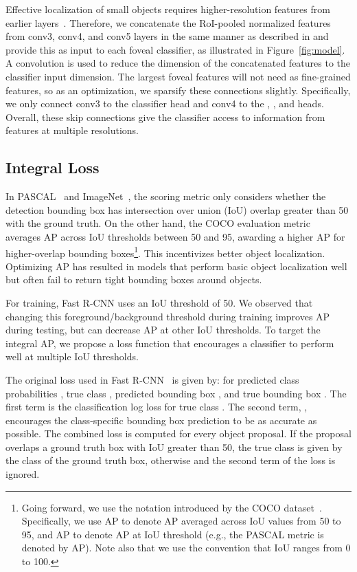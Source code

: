 \documentclass{bmvc2k}
\newcommand{\AP}[1]{AP\xspace}
\newcommand{\fig}[1]{Figure~\ref{fig:#1}}
\begin{document}
Effective localization of small objects requires higher-resolution features from earlier layers~\cite{sermanetCVPR2013, longCVPR15fcn, BharathCVPR2015, bell15ion, pinheiro2016refining}. Therefore, we concatenate the RoI-pooled normalized features from conv3, conv4, and conv5 layers in the same manner as described in \cite{bell15ion} and provide this as input to each foveal classifier, as illustrated in \fig{model}. A  convolution is used to reduce the dimension of the concatenated features to the classifier input dimension. The largest foveal features will not need as fine-grained features, so as an optimization, we sparsify these connections slightly. Specifically, we only connect conv3 to the  classifier head and conv4 to the , , and  heads. Overall, these skip connections give the classifier access to information from features at multiple resolutions.

\subsection{Integral Loss}

In PASCAL~\cite{Everingham10} and ImageNet~\cite{imagenet_cvpr09}, the scoring metric only considers whether the detection bounding box has intersection over union (IoU) overlap greater than 50 with the ground truth. On the other hand, the COCO evaluation metric~\cite{mscoco2015} averages AP across IoU thresholds between 50 and 95, awarding a higher AP for higher-overlap bounding boxes\footnote{Going forward, we use the notation introduced by the COCO dataset~\cite{mscoco2015}. Specifically, we use AP to denote AP averaged across IoU values from 50 to 95, and \AP{u} to denote AP at IoU threshold  (e.g., the PASCAL metric is denoted by \AP{50}). Note also that we use the convention that IoU ranges from 0 to 100.}. This incentivizes better object localization. Optimizing \AP{50} has resulted in models that perform basic object localization well but often fail to return tight bounding boxes around objects.

For training, Fast R-CNN uses an IoU threshold of 50. We observed that changing this foreground/background threshold  during training improves \AP{u} during testing, but can decrease AP at other IoU thresholds. To target the integral AP, we propose a loss function that encourages a classifier to perform well at multiple IoU thresholds.

The original loss  used in Fast R-CNN~\cite{girshick15fastrcnn} is given by:
for predicted class probabilities , true class , predicted bounding box , and true bounding box . The first term  is the classification log loss for true class . The second term, , encourages the class-specific bounding box prediction to be as accurate as possible. The combined loss is computed for every object proposal. If the proposal overlaps a ground truth box with IoU greater than 50, the true class  is given by the class of the ground truth box, otherwise  and the second term of the loss is ignored.
\end{document}
